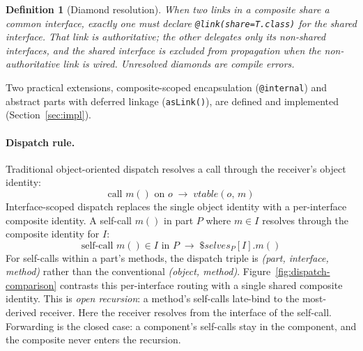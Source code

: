 \documentclass[acmsmall,nonacm]{acmart}
\theoremstyle{acmplain}
\theoremstyle{acmdefinition}
\newtheorem{definition}{Definition}
\newcommand{\code}[1]{\texttt{#1}}
\begin{document}
\begin{definition}[Diamond resolution]
\label{def:diamond}
When two links in a composite share a common interface, exactly one must declare
\code{@link(share=T.class)} for the shared interface. That link is
authoritative; the other delegates only its non-shared interfaces, and the
shared interface is excluded from propagation when the non-authoritative link is
wired. Unresolved diamonds are compile errors.
\end{definition}

Two practical extensions, composite-scoped encapsulation (\code{@internal})
and abstract parts with deferred linkage (\code{asLink()}), are defined
and implemented (Section~\ref{sec:impl}).

\paragraph{Dispatch rule.}
Traditional object-oriented dispatch resolves a call through the receiver's
object identity:
\[ \text{call } m() \text{ on } o \;\longrightarrow\; \mathit{vtable}(o,\, m) \]
Interface-scoped dispatch replaces the single object identity with a
per-interface composite identity. A self-call $m()$ in part $P$ where
$m \in I$ resolves through the composite identity for $I$:
\[ \text{self-call } m() \in I \text{ in } P \;\longrightarrow\;
   \$\mathit{selves}_P[I].m() \]
For self-calls within a part's methods, the dispatch triple is
\emph{(part, interface, method)} rather than the conventional
\emph{(object, method)}.
Figure~\ref{fig:dispatch-comparison} contrasts this per-interface routing with a single shared composite identity.
This is \emph{open recursion}: a method's self-calls late-bind to the
most-derived receiver. Here the receiver resolves from the interface of the self-call. Forwarding is the closed case: a
component's self-calls stay in the component, and the composite never enters
the recursion.
\end{document}
